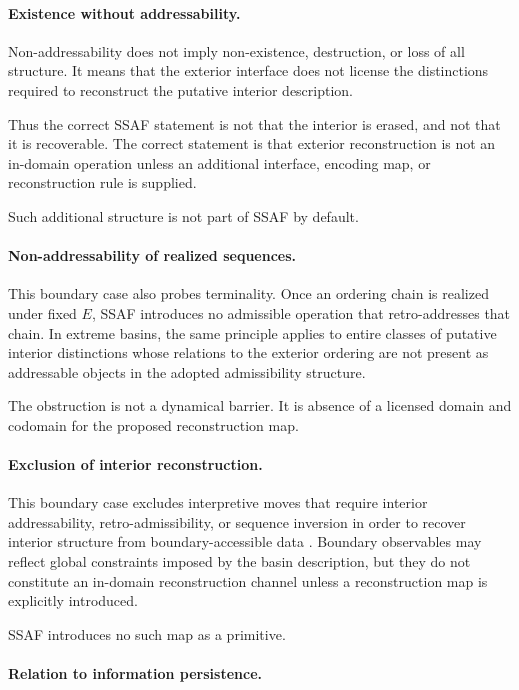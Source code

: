 \documentclass[aps,prx,onecolumn,11pt]{revtex4-2}
\theoremstyle{plain}
\theoremstyle{definition}
\theoremstyle{remark}
\begin{document}
\paragraph{Existence without addressability.}

Non-addressability does not imply non-existence, destruction, or loss
of all structure. It means that the exterior interface does not license
the distinctions required to reconstruct the putative interior
description.

Thus the correct SSAF statement is not that the interior is erased, and
not that it is recoverable. The correct statement is that exterior
reconstruction is not an in-domain operation unless an additional
interface, encoding map, or reconstruction rule is supplied.

Such additional structure is not part of SSAF by default.

\paragraph{Non-addressability of realized sequences.}

This boundary case also probes terminality. Once an ordering chain is
realized under fixed \(E\), SSAF introduces no admissible operation that
retro-addresses that chain. In extreme basins, the same principle
applies to entire classes of putative interior distinctions whose
relations to the exterior ordering are not present as addressable
objects in the adopted admissibility structure.

The obstruction is not a dynamical barrier. It is absence of a licensed
domain and codomain for the proposed reconstruction map.

\paragraph{Exclusion of interior reconstruction.}

This boundary case excludes interpretive moves that require interior
addressability, retro-admissibility, or sequence inversion in order to
recover interior structure from boundary-accessible data
\cite{Hawking1976,Mathur2009}. Boundary observables may reflect
global constraints imposed by the basin description, but they do not
constitute an in-domain reconstruction channel unless a reconstruction
map is explicitly introduced.

SSAF introduces no such map as a primitive.

\paragraph{Relation to information persistence.}
\end{document}
